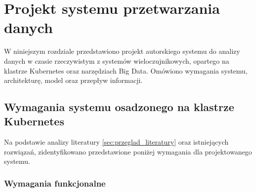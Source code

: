 \section{Projekt systemu przetwarzania danych}
\label{sec:projekt_systemu}

W niniejszym rozdziale przedstawiono projekt autorskiego systemu do analizy danych w czasie rzeczywistym z systemów wieloczujnikowych, opartego na klastrze Kubernetes oraz narzędziach Big Data. Omówiono wymagania systemu, architekturę, model oraz przepływ informacji.

\subsection{Wymagania systemu osadzonego na klastrze Kubernetes}
\label{subsec:wymagania}

Na podstawie analizy literatury \ref{sec:przeglad_literatury} oraz istniejących rozwiązań, zidentyfikowano przedstawione poniżej wymagania dla projektowanego systemu.

\subsubsection{Wymagania funkcjonalne}
\label{subsubsec:wymagania_funkcjonalne}

